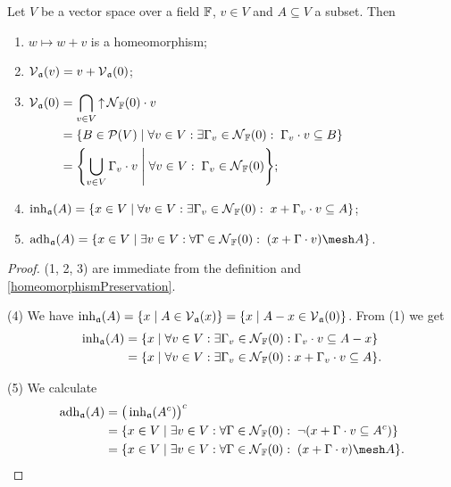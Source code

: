 \begin{lemma} \label{constructionsInAlgebraicConvergence}
Let $V$ be a vector space over a field $\mathbb{F}$, $v\in V$ and $A\subseteq V$ a subset. Then
\begin{enumerate}
\item $w\mapsto w+v$ is a homeomorphism;
\item $\operatorname{\mathcal{V}}_\mathfrak{a}(v) = v+\operatorname{\mathcal{V}}_\mathfrak{a}(0)$;
\item $\begin{aligned}[t]
\vicinity_\mathfrak{a}(0) &= \bigcap_{v\in V} \upset \neighbourhood_\F(0)\cdot v \\
&= \setbuilder{B\in \powerset(V)}{\forall v\in V: \exists \Gamma_v\in \neighbourhood_\F(0):\; \Gamma_v\cdot v\subseteq B} \\
&= \setbuilder{\bigcup_{v\in V} \Gamma_v\cdot v}{\forall v\in V:\; \Gamma_v \in \neighbourhood_\F(0)};
\end{aligned}$
\item $\inh_\mathfrak{a}(A) = \setbuilder{x\in V}{\forall v\in V:\exists \Gamma_v \in \neighbourhood_\F(0):\; x + \Gamma_v\cdot v \subseteq A}$;
\item $\adh_\mathfrak{a}(A) = \setbuilder{x\in V}{\exists v\in V: \forall \Gamma\in\neighbourhood_\F(0):\; (x+\Gamma\cdot v)\mesh A}$.
\end{enumerate}
\end{lemma}
\begin{proof}
(1, 2, 3) are immediate from the definition and \ref{homeomorphismPreservation}.

(4) We have $\inh_\mathfrak{a}(A) = \setbuilder{x}{A\in \vicinity_\mathfrak{a}(x)} = \setbuilder{x}{A-x\in \vicinity_\mathfrak{a}(0)}$. From (1) we get 
\begin{align*}
\inh_\mathfrak{a}(A) &= \setbuilder{x}{\forall v\in V: \exists \Gamma_v\in \neighbourhood_\F(0): \Gamma_v\cdot v \subseteq A-x} \\
&= \setbuilder{x}{\forall v\in V: \exists \Gamma_v\in \neighbourhood_\F(0): x + \Gamma_v\cdot v \subseteq A}.
\end{align*}

(5) We calculate
\begin{align*}
\adh_\mathfrak{a}(A) &= \big(\inh_\mathfrak{a}(A^c)\big)^c \\
&= \setbuilder{x\in V}{\exists v\in V:\forall \Gamma \in \neighbourhood_\F(0):\; \neg(x + \Gamma\cdot v \subseteq A^c)} \\
&= \setbuilder{x\in V}{\exists v\in V:\forall \Gamma \in \neighbourhood_\F(0):\; (x + \Gamma\cdot v) \mesh A}.
\end{align*}
\end{proof}

